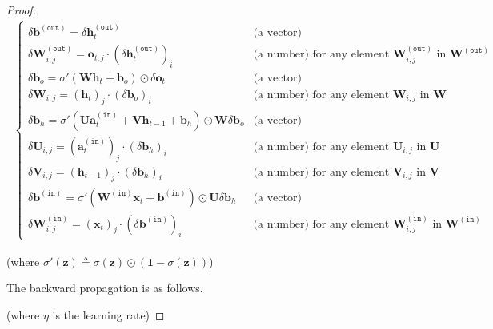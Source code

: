 \documentclass{article}
\renewcommand{\bf}[1]{\mathbf{#1}}
\renewcommand{\tt}[1]{\mathtt{#1}}
\begin{document}
\begin{proof}
    \vspace{-2.2em}
    \begin{align*}
        \ \left\{
        \begin{array}{ll}
            \delta\bf{b}^{\tt{(out)}} = \delta\bf{h}_t^{\tt{(out)}} & \text{(a vector)} \\
            \delta\bf{W}_{i,j}^{\tt{(out)}} = \bf{o}_{t,j}\cdot\left(\delta\bf{h}^{\tt{(out)}}_t\right)_i & \text{(a number) for any element $\bf{W}^{\tt{(out)}}_{i,j}$ in $\bf{W}^{\tt{(out)}}$} \\
            \delta\bf{b}_o = \sigma'(\bf{W}\bf{h}_t+\bf{b}_o)\odot\delta\bf{o}_t & \text{(a vector)} \\
            \delta\bf{W}_{i,j} = \left(\bf{h}_t\right)_j\cdot\left(\delta\bf{b}_o\right)_i & \text{(a number) for any element $\bf{W}_{i,j}$ in $\bf{W}$} \\
            \delta\bf{b}_h = \sigma'\left(\bf{U}\bf{a}_t^{\tt{(in)}}+\bf{V}\bf{h}_{t-1}+\bf{b}_h\right)\odot\bf{W}\delta\bf{b}_o & \text{(a vector)} \\
            \delta\bf{U}_{i,j}=\left(\bf{a}_t^{\tt{(in)}}\right)_j\cdot\left(\delta\bf{b}_h\right)_i & \text{(a number) for any element $\bf{U}_{i,j}$ in $\bf{U}$} \\
            \delta\bf{V}_{i,j} = \left(\bf{h}_{t-1}\right)_j\cdot\left(\delta\bf{b}_h\right)_i & \text{(a number) for any element $\bf{V}_{i,j}$ in $\bf{V}$} \\
            \delta\bf{b}^{\tt{(in)}} = \sigma'\left(\bf{W}^{\tt{(in)}}\bf{x}_t+\bf{b}^{\tt{(in)}}\right) \odot \bf{U}\delta\bf{b}_h & \text{(a vector)} \\
            \delta \bf{W}_{i,j}^{\tt{(in)}} = \left(\bf{x}_t\right)_j\cdot\left(\delta\bf{b}^{\tt{(in)}}\right)_i & \text{(a number) for any element $\bf{W}_{i,j}^{\tt{(in)}}$ in $\bf{W}^{\tt{(in)}}$}
        \end{array}
        \right.
    \end{align*}
    
    \vspace{-0.5em} \hspace{1.3em}
    (where $\sigma'(\bf{z})\triangleq\sigma(\bf{z})\odot\left(\bf{1}-\sigma(\bf{z})\right)$)
    
    \vspace{1em} \hspace{1.3em}
    The backward propagation is as follows. 
    
    \hspace{1.3em}
    (where $\eta$ is the learning rate)
    

\end{proof}
\end{document}
